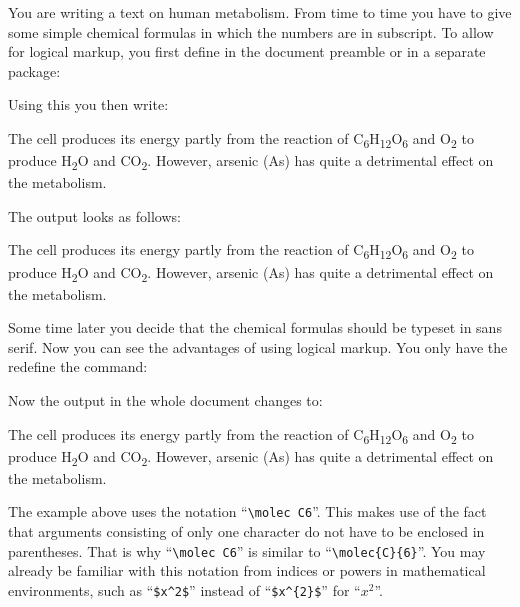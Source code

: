     \begin{Example}
      You are writing a text on human metabolism. From time to time you
      have to give some simple chemical formulas in which the numbers are
      in subscript. To allow for logical markup, you first define in the
      document preamble or in a separate package:
\begin{lstcode}
  \newcommand*{\molec}[2]{#1\textsubscript{#2}}
\end{lstcode}
      \newcommand*{\molec}[2]{#1\textsubscript{#2}}
      Using this you then write:
\begin{lstcode}
  The cell produces its energy partly from the reaction of \molec C6\molec
  H{12}\molec O6 and \molec O2 to produce \molec H2\Molec O{} and
  \molec C{}\molec O2.  However, arsenic (\molec{As}{}) has quite a
  detrimental effect on the metabolism.
\end{lstcode}
      The output looks as follows:
      \begin{ShowOutput}
        The cell produces its energy partly from the reaction of \molec C6\molec
        H{12}\molec O6 and \molec O2 to produce \molec H2\molec O{} and
        \molec C{}\molec O2.  However, arsenic (\molec{As}{}) has quite a
        detrimental effect on the metabolism.
      \end{ShowOutput}

      Some time later you decide that the chemical formulas should be
      typeset in sans serif. Now you can see the advantages of using
      logical markup. You only have the redefine the 
      command:
\begin{lstcode}
  \newcommand*{\molec}[2]{\textsf{#1\textsubscript{#2}}}
\end{lstcode}
      \renewcommand*{\molec}[2]{\textsf{#1\textsubscript{#2}}}
      Now the output in the whole document changes to:
      \begin{ShowOutput}
        The cell produces its energy partly from the reaction of \molec
        C6\molec H{12}\molec O6 and \molec O2 to produce \molec H2\molec
        O{} and \molec C{}\molec O2.  However, arsenic (\molec{As}{}) has
        quite a detrimental effect on the metabolism.
      \end{ShowOutput}
    \end{Example}
    \iftrue
      \begin{Explain}
        The example above uses the notation ``\verb|\molec C6|''. 
        This makes use of the fact that arguments consisting of only one
        character do not have to be enclosed in parentheses. That is why
        ``\verb|\molec C6|'' is similar to ``\verb|\molec{C}{6}|''. You
        may already be familiar with this notation from indices or powers in
        mathematical environments, such as ``\verb|$x^2$|'' instead of
        ``\verb|$x^{2}$|''
        for ``$x^2$''.
      \end{Explain}
